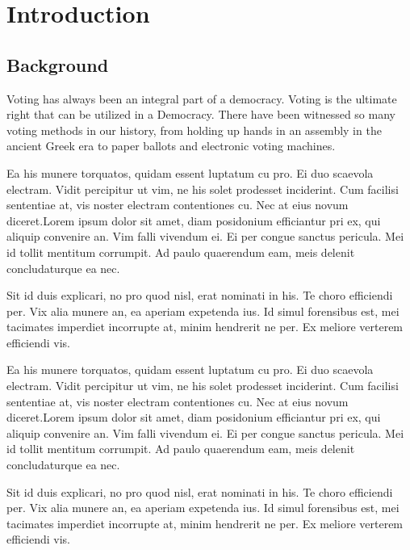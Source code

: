 

\newpage
{} %

\chapter{Introduction}
\section{Background}\label{sec:bkgrnd}%
Voting has always been an integral part of a democracy.  Voting is the ultimate right that can be utilized in a Democracy.  There  have been witnessed so many voting methods in our history, from holding up hands in an assembly in the ancient Greek era to paper ballots and electronic voting machines.

Ea his munere torquatos, quidam essent luptatum cu pro. Ei duo scaevola electram. Vidit percipitur ut vim, ne his solet prodesset inciderint. Cum facilisi sententiae at, vis noster electram contentiones cu. Nec at eius novum diceret.Lorem ipsum dolor sit  amet, diam posidonium efficiantur pri ex, qui aliquip convenire an. Vim falli vivendum ei. Ei per congue sanctus pericula. Mei id tollit mentitum corrumpit. Ad paulo quaerendum eam, meis delenit concludaturque ea nec.\par
Sit id duis explicari, no pro quod nisl, erat nominati in his. Te choro efficiendi per. Vix alia munere an, ea aperiam expetenda ius. Id simul forensibus est, mei tacimates imperdiet incorrupte at, minim hendrerit ne per. Ex meliore verterem efficiendi vis.

Ea his munere torquatos, quidam essent luptatum cu pro. Ei duo scaevola electram. Vidit percipitur ut vim, ne his solet prodesset inciderint. Cum facilisi sententiae at, vis noster electram contentiones cu. Nec at eius novum diceret.Lorem ipsum dolor sit  amet, diam posidonium efficiantur pri ex, qui aliquip convenire an. Vim falli vivendum ei. Ei per congue sanctus pericula. Mei id tollit mentitum corrumpit. Ad paulo quaerendum eam, meis delenit concludaturque ea nec.\par
Sit id duis explicari, no pro quod nisl, erat nominati in his. Te choro efficiendi per. Vix alia munere an, ea aperiam expetenda ius. Id simul forensibus est, mei tacimates imperdiet incorrupte at, minim hendrerit ne per. Ex meliore verterem efficiendi vis.

